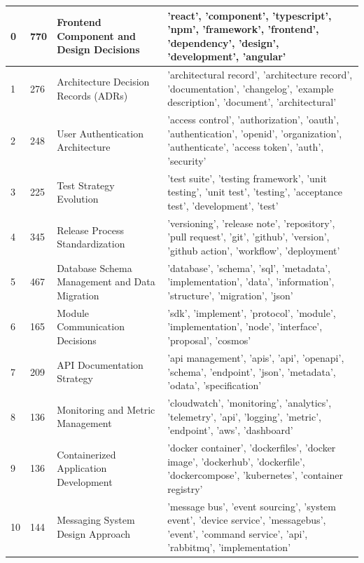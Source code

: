 \begin{longtable}{|p{1cm}|p{1.12cm}|p{3.3cm}|p{9cm}|}
            0 & 770 & Frontend Component and Design Decisions & 'react', 'component', 'typescript', 'npm', 'framework', 'frontend', 'dependency', 'design', 'development', 'angular' \\
            \hline
            1 & 276 & Architecture Decision Records (ADRs) & 'architectural record', 'architecture record', 'documentation', 'changelog', 'example description', 'document', 'architectural' \\
            \hline
            2 & 248 & User Authentication Architecture & 'access control', 'authorization', 'oauth', 'authentication', 'openid', 'organization', 'authenticate', 'access token', 'auth', 'security' \\
            \hline
            3 & 225 & Test Strategy Evolution & 'test suite', 'testing framework', 'unit testing', 'unit test', 'testing', 'acceptance test', 'development', 'test' \\
            \hline
            4 & 345 & Release Process Standardization & 'versioning', 'release note', 'repository', 'pull request', 'git', 'github', 'version', 'github action', 'workflow', 'deployment' \\
            \hline
            5 & 467 & Database Schema Management and Data Migration & 'database', 'schema', 'sql', 'metadata', 'implementation', 'data', 'information', 'structure', 'migration', 'json' \\
            \hline
            6 & 165 & Module Communication Decisions & 'sdk', 'implement', 'protocol', 'module', 'implementation', 'node', 'interface', 'proposal', 'cosmos' \\
            \hline
            7 & 209 & API Documentation Strategy & 'api management', 'apis', 'api', 'openapi', 'schema', 'endpoint', 'json', 'metadata', 'odata', 'specification' \\
            \hline
            8 & 136 & Monitoring and Metric Management & 'cloudwatch', 'monitoring', 'analytics', 'telemetry', 'api', 'logging', 'metric', 'endpoint', 'aws', 'dashboard' \\
            \hline
            9 & 136 & Containerized Application Development & 'docker container', 'dockerfiles', 'docker image', 'dockerhub', 'dockerfile', 'dockercompose', 'kubernetes', 'container registry' \\
            \hline
            10 & 144 & Messaging System Design Approach & 'message bus', 'event sourcing', 'system event', 'device service', 'messagebus', 'event', 'command service', 'api', 'rabbitmq', 'implementation' \\

\end{longtable}
